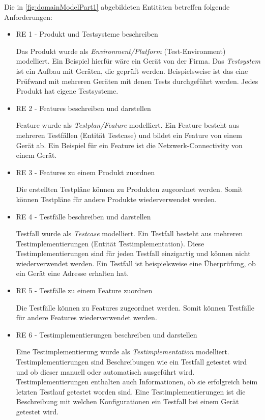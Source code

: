 \documentclass[a4paper, fontsize=11pt, parskip=half, twoside]{scrreprt}
\begin{document}
	Die in \autoref{fig:domainModelPart1} abgebildeten Entitäten betreffen folgende Anforderungen:
	
	\begin{itemize}
		\item RE 1 - Produkt und Testsysteme beschreiben
		
		Das Produkt wurde als \emph{Environment/Platform} (Test-Environment) modelliert.
		Ein Beispiel hierfür wäre ein Gerät von der Firma.
		Das \emph{Testsystem} ist ein Aufbau mit Geräten, die geprüft werden. 
		Beispielsweise ist das eine Prüfwand mit mehreren Geräten mit denen Tests durchgeführt werden.
		Jedes Produkt hat eigene Testsysteme.
		
		\item RE 2 - Features beschreiben und darstellen
		
		Feature wurde als \emph{Testplan/Feature} modelliert.
		Ein Feature besteht aus mehreren Testfällen (Entität Testcase) und bildet ein Feature von einem Gerät ab.
		Ein Beispiel für ein Feature ist die Netzwerk-Connectivity von einem Gerät.
		
		\item RE 3 - Features zu einem Produkt zuordnen
		
		Die erstellten Testpläne können zu Produkten zugeordnet werden.
		Somit können Testpläne für andere Produkte wiederverwendet werden.
		
		\item RE 4 - Testfälle beschreiben und darstellen
		
		Testfall wurde als \emph{Testcase} modelliert.
	    Ein Testfall besteht aus mehreren Testimplementierungen (Entität Testimplementation).
	    Diese Testimplementierungen sind für jeden Testfall einzigartig und können nicht wiederverwendet werden. 
	    Ein Testfall ist beispielsweise eine Überprüfung, ob ein Gerät eine  Adresse erhalten hat.
		
		\item RE 5 - Testfälle zu einem Feature zuordnen
		
		Die Testfälle können zu Features zugeordnet werden.
		Somit können Testfälle für andere Features wiederverwendet werden.
		
		\item RE 6 - Testimplementierungen beschreiben und darstellen
		
		Eine Testimplementierung wurde als \emph{Testimplementation} modelliert.
		Testimplementierungen sind Beschreibungen wie ein Testfall getestet wird und ob dieser manuell oder automatisch ausgeführt wird.
		Testimplementierungen enthalten auch Informationen, ob sie erfolgreich beim letzten Testlauf getestet worden sind.
		Eine Testimplementierungen ist die Beschreibung mit welchen Konfigurationen ein Testfall bei einem Gerät getestet wird.
		

\end{itemize}
\end{document}
